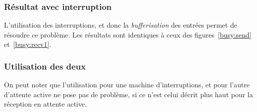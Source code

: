\documentclass{article}
\begin{document}
\subsubsection{Résultat avec interruption}
L'utilisation des interruptions, et donc la \emph{bufferisation} des entrées permet de résoudre ce problème. Les résultats sont identiques à ceux des figures~\ref{busy:send} et~\ref{busy:recv1}.

\subsubsection{Utilisation des deux}
On peut noter que l'utilisation pour une machine d'interruptions, et pour l'autre d'attente active ne pose pas de problème, si ce n'est celui décrit plus haut pour la réception en attente active.

\end{document}
